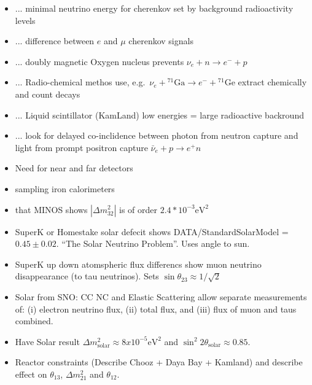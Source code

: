 \documentclass[txfonts]{NSTexam}
\begin{document}
\begin{questions}
\begin{parts}
\begin{itemize}
\item ... minimal neutrino energy for cherenkov set by background radioactivity levels
\item ... difference between $e$ and $\mu$ cherenkov signals
\item ... doubly magnetic Oxygen nucleus prevents $\nu_e + n \rightarrow e^- +p$
\item ... Radio-chemical methos use, e.g.~$\nu_e + {}^{71}\text{Ga}\rightarrow e^-+{}^{71}\text{Ge}$ extract chemically and count decays
\item ... Liquid scintillator (KamLand) low energies = large radioactive backround
\item ... look for delayed co-inclidence between photon from neutron capture and light from prompt positron capture $\bar\nu_e+p\rightarrow e^+ n$
\item Need for near and far detectors
\item sampling iron calorimeters
\item that MINOS shows $|\Delta m_{32}^2|$ is of order $2.4*10^{-3} {\text{eV}}^2$
\item SuperK or Homestake solar defecit shows DATA/StandardSolarModel = $0.45\pm0.02$. ``The Solar Neutrino Problem''. Uses angle to sun.
\item SuperK up down atomspheric flux differencs show muon neutrino disappearance (to tau neutrinos). Sets $\sin{\theta_{23}}\approx 1/\sqrt{2}$
\item Solar from SNO: CC NC and Elastic Scattering allow separate measurements of: (i) electron neutrino flux, (ii) total flux, and (iii) flux of muon and taus combined.
\item Have Solar result $\Delta m^2_{\text{solar}} \approx 8x10^{-5} {\text{eV}}^2$ and $\sin^2{2\theta_{\text{solar}}} \approx 0.85$.
\item Reactor constraints (Describe Chooz + Daya Bay + Kamland) and describe effect on $\theta_{13}$, $\Delta m_{21}^2$ and $\theta_{12}$.
\end{itemize}

\end{parts}
\end{questions}
\end{document}
